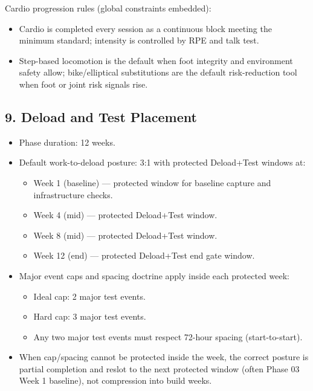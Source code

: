 \documentclass[10pt]{article}
\begin{document}
\begin{landscape}
Cardio progression rules (global constraints embedded):

\begin{itemize}
\item Cardio is completed every session as a continuous block meeting the minimum standard; intensity is controlled by RPE and talk test.
\item Step-based locomotion is the default when foot integrity and environment safety allow; bike/elliptical substitutions are the default risk-reduction tool when foot or joint risk signals rise.
\end{itemize}

\subsection*{9. Deload and Test Placement}

\begin{itemize}
\item Phase duration: 12 weeks.
\item Default work-to-deload posture: 3:1 with protected Deload+Test windows at:
\begin{itemize}
\item Week 1 (baseline) — protected window for baseline capture and infrastructure checks.
\item Week 4 (mid) — protected Deload+Test window.
\item Week 8 (mid) — protected Deload+Test window.
\item Week 12 (end) — protected Deload+Test end gate window.
\end{itemize}
\item Major event caps and spacing doctrine apply inside each protected week:
\begin{itemize}
\item Ideal cap: 2 major test events.
\item Hard cap: 3 major test events.
\item Any two major test events must respect 72-hour spacing (start-to-start).
\end{itemize}
\item When cap/spacing cannot be protected inside the week, the correct posture is partial completion and reslot to the next protected window (often Phase 03 Week 1 baseline), not compression into build weeks.
\end{itemize}

\end{landscape}
\end{document}
